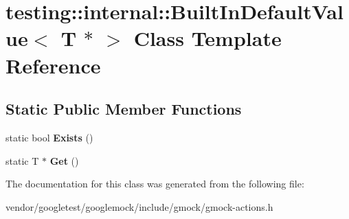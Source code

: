 \hypertarget{classtesting_1_1internal_1_1_built_in_default_value_3_01_t_01_5_01_4}{}\section{testing\+:\+:internal\+:\+:Built\+In\+Default\+Value$<$ T $\ast$ $>$ Class Template Reference}
\label{classtesting_1_1internal_1_1_built_in_default_value_3_01_t_01_5_01_4}
\subsection*{Static Public Member Functions}
\begin{DoxyCompactItemize}
\item 
\mbox{\label{classtesting_1_1internal_1_1_built_in_default_value_3_01_t_01_5_01_4_aafa7172f63d068305fb37d5db40bb543}} 
static bool {\bfseries Exists} ()
\item 
\mbox{\label{classtesting_1_1internal_1_1_built_in_default_value_3_01_t_01_5_01_4_adc2fa2bdae767589d171ae3a117e3a9f}} 
static T $\ast$ {\bfseries Get} ()
\end{DoxyCompactItemize}


The documentation for this class was generated from the following file\+:\begin{DoxyCompactItemize}
\item 
vendor/googletest/googlemock/include/gmock/gmock-\/actions.\+h\end{DoxyCompactItemize}
